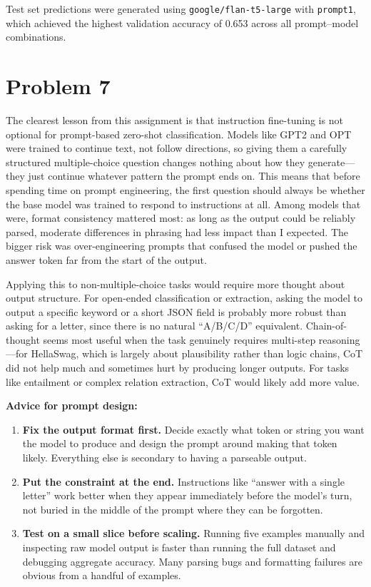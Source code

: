 \documentclass[11pt]{article}
\begin{document}
Test set predictions were generated using \texttt{google/flan-t5-large} with \texttt{prompt1}, which achieved the highest validation accuracy of 0.653 across all prompt--model combinations.

\section*{Problem 7}

The clearest lesson from this assignment is that instruction fine-tuning is not optional for prompt-based zero-shot classification. Models like GPT2 and OPT were trained to continue text, not follow directions, so giving them a carefully structured multiple-choice question changes nothing about how they generate---they just continue whatever pattern the prompt ends on. This means that before spending time on prompt engineering, the first question should always be whether the base model was trained to respond to instructions at all. Among models that were, format consistency mattered most: as long as the output could be reliably parsed, moderate differences in phrasing had less impact than I expected. The bigger risk was over-engineering prompts that confused the model or pushed the answer token far from the start of the output.

Applying this to non-multiple-choice tasks would require more thought about output structure. For open-ended classification or extraction, asking the model to output a specific keyword or a short JSON field is probably more robust than asking for a letter, since there is no natural ``A/B/C/D'' equivalent. Chain-of-thought seems most useful when the task genuinely requires multi-step reasoning---for HellaSwag, which is largely about plausibility rather than logic chains, CoT did not help much and sometimes hurt by producing longer outputs. For tasks like entailment or complex relation extraction, CoT would likely add more value.

\textbf{Advice for prompt design:}
\begin{enumerate}[leftmargin=*]
    \item \textbf{Fix the output format first.} Decide exactly what token or string you want the model to produce and design the prompt around making that token likely. Everything else is secondary to having a parseable output.
    \item \textbf{Put the constraint at the end.} Instructions like ``answer with a single letter'' work better when they appear immediately before the model's turn, not buried in the middle of the prompt where they can be forgotten.
    \item \textbf{Test on a small slice before scaling.} Running five examples manually and inspecting raw model output is faster than running the full dataset and debugging aggregate accuracy. Many parsing bugs and formatting failures are obvious from a handful of examples.
\end{enumerate}
\end{document}

